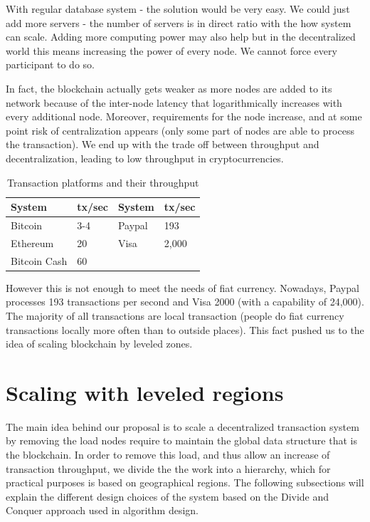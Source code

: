 With regular database system - the solution would be very easy. We could just
add more servers - the number of servers is in direct ratio with the how system
can scale. Adding more computing power may also help but in the decentralized
world this means increasing the power of every node.  We cannot force every
participant to do so.

In fact, the blockchain actually gets weaker as more nodes are added to its
network because of the inter-node latency that logarithmically increases with
every additional node. Moreover, requirements for the node increase, and at
some point risk of centralization appears (only some part of nodes are able to
process the transaction). We end up with the trade off between throughput and
decentralization, leading to low throughput in cryptocurrencies.

\begin{table}
\centering
\begin{tabular}{l l | l l}
\textbf{System} & \textbf{tx/sec} & \textbf{System} & \textbf{tx/sec} \\
\midrule
Bitcoin & 3-4 &        Paypal &  193 \\
Ethereum & 20 &        Visa & 2,000 \\
Bitcoin Cash & 60 &          &       \\
\end{tabular}
\caption{Transaction platforms and their throughput}
\end{table}

However this is not enough to meet the needs of fiat currency.  Nowadays,
Paypal processes 193 transactions per second and Visa 2000 (with a capability
of 24,000). The majority of all transactions are local transaction (people do
fiat currency transactions locally more often than to outside places). This
fact pushed us to the idea of scaling blockchain by leveled zones.

\section{Scaling with leveled regions}

The main idea behind our proposal is to scale a decentralized transaction
system by removing the load nodes require to maintain the global data structure
that is the blockchain.  In order to remove this load, and thus allow an
increase of transaction throughput, we divide the the work into a hierarchy,
which for practical purposes is based on geographical regions.  The following
subsections will explain the different design choices of the system based on
the Divide and Conquer approach used in algorithm design.

